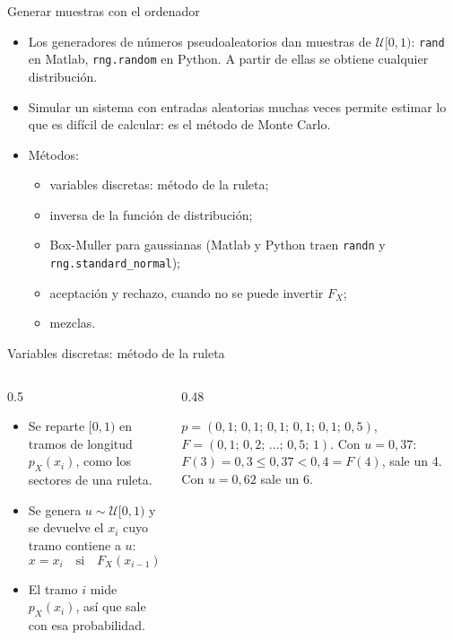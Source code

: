 \documentclass[aspectratio=169,11pt]{beamer}
\begin{document}
\begin{frame}{Generar muestras con el ordenador}
  \small
  \begin{itemize}
    \item Los generadores de números pseudoaleatorios dan muestras de $\mathcal U[0,1)$: \texttt{rand} en Matlab, \texttt{rng.random} en Python. A partir de ellas se obtiene cualquier distribución.
    \item \alert{Simular} un sistema con entradas aleatorias muchas veces permite estimar lo que es difícil de calcular: es el método de \alert{Monte Carlo}.
    \item Métodos:
    \begin{itemize}
      \item variables discretas: método de la ruleta;
      \item inversa de la función de distribución;
      \item Box-Muller para gaussianas (Matlab y Python traen \texttt{randn} y \texttt{rng.standard\_normal});
      \item aceptación y rechazo, cuando no se puede invertir $F_X$;
      \item mezclas.
    \end{itemize}
  \end{itemize}
\end{frame}

\begin{frame}{Variables discretas: método de la ruleta}
  \begin{columns}[c]
    \begin{column}{0.5\textwidth}
      \small
      \begin{itemize}
        \item Se reparte $[0,1)$ en tramos de longitud $p_X(x_i)$, como los sectores de una ruleta.
        \item Se genera $u\sim\mathcal U[0,1)$ y se devuelve el $x_i$ cuyo tramo contiene a $u$:
        \[
          x=x_i\quad\text{si}\quad F_X(x_{i-1})\le u<F_X(x_i).
        \]
        \item El tramo $i$ mide $p_X(x_i)$, así que sale con esa probabilidad.
      \end{itemize}
    \end{column}
    \begin{column}{0.48\textwidth}
      \begin{ejemplo}
        \footnotesize
        $p=(0{,}1;\,0{,}1;\,0{,}1;\,0{,}1;\,0{,}1;\,0{,}5)$, $F=(0{,}1;\,0{,}2;\,\dots;\,0{,}5;\,1)$. Con $u=0{,}37$: $F(3)=0{,}3\le0{,}37<0{,}4=F(4)$, sale un 4. Con $u=0{,}62$ sale un 6.
      \end{ejemplo}
    \end{column}
  \end{columns}
\end{frame}
\end{document}
